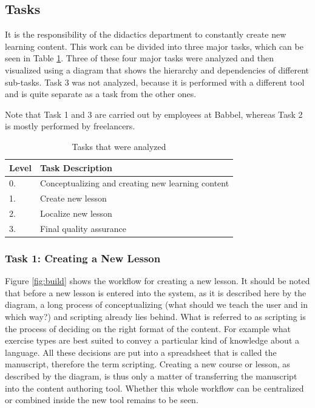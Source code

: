 \subsection{Tasks} \label{tasks}
It is the responsibility of the didactics department to constantly create new learning content. This work can be divided into three major tasks, which can be seen in Table \ref{table:analyzed-tasks}. Three of these four major tasks were analyzed and then visualized using a diagram that shows the hierarchy and dependencies of different sub-tasks. Task 3 was not analyzed, because it is performed with a different tool and is quite separate as a task from the other ones.

Note that Task 1 and 3 are carried out by employees at Babbel, whereas Task 2 is mostly performed by freelancers.


\begin{table}[h]
\centering
\begin{tabular}{|l|l|}
\hline
\rowcolor[HTML]{EFEFEF}
{\bf Level} & {\bf Task Description}      \\ \hline
0. & Conceptualizing and creating new learning content \\ \hline
1. & Create new lesson           \\
2. & Localize new lesson         \\
3. & Final quality assurance        \\ \hline
\end{tabular}
\caption{Tasks that were analyzed}
\label{table:analyzed-tasks}
\end{table}

\subsubsection{Task 1: Creating a New Lesson}
Figure \ref{fig:build} shows the workflow for creating a new lesson. It should be noted that before a new lesson is entered into the system, as it is described here by the diagram, a long process of conceptualizing (what should we teach the user and in which way?) and scripting already lies behind. What is referred to as scripting is the process of deciding on the right format of the content. For example what exercise types are best suited to convey a particular kind of knowledge about a language. All these decisions are put into a spreadsheet that is called the manuscript, therefore the term scripting. Creating a new course or lesson, as described by the diagram, is thus only a matter of transferring the manuscript into the content authoring tool. Whether this whole workflow can be centralized or combined inside the new tool remains to be seen.

